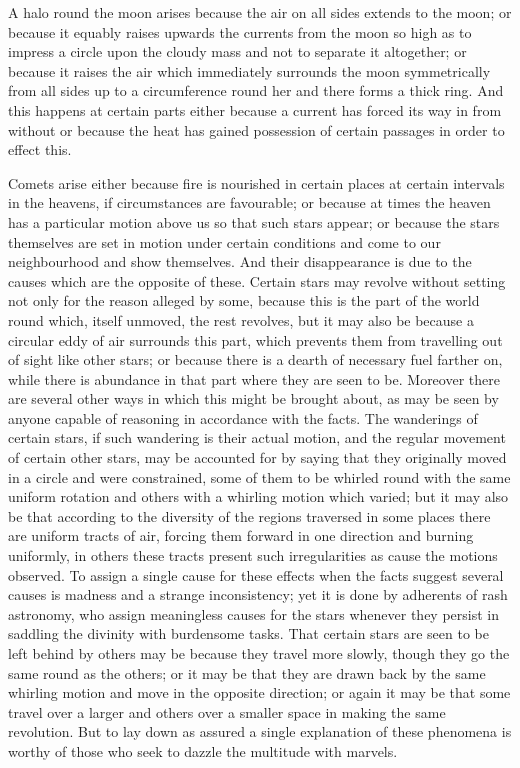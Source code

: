 \documentclass{stex}
\begin{document}
A halo round the moon arises because the air on all sides extends to the moon; or because it equably raises upwards the currents from the moon so high as to impress a circle upon the cloudy mass and not to separate it altogether; or because it raises the air which immediately surrounds the moon symmetrically from all sides up to a circumference round her and there forms a thick ring.
And this happens at certain parts either because a current has forced its way in from without or because the heat has gained possession of certain passages in order to effect this.

Comets arise either because fire is nourished in certain places at certain intervals in the heavens, if circumstances are favourable; or because at times the heaven has a particular motion above us so that such stars appear; or because the stars themselves are set in motion under certain conditions and come to our neighbourhood and show themselves.
And their disappearance is due to the causes which are the opposite of these.
Certain stars may revolve without setting not only for the reason alleged by some, because this is the part of the world round which, itself unmoved, the rest revolves, but it may also be because a circular eddy of air surrounds this part, which prevents them from travelling out of sight like other stars; or because there is a dearth of necessary fuel farther on, while there is abundance in that part where they are seen to be.
Moreover there are several other ways in which this might be brought about, as may be seen by anyone capable of reasoning in accordance with the facts.
The wanderings of certain stars, if such wandering is their actual motion, and the regular movement of certain other stars, may be accounted for by saying that they originally moved in a circle and were constrained, some of them to be whirled round with the same uniform rotation and others with a whirling motion which varied; but it may also be that according to the diversity of the regions traversed in some places there are uniform tracts of air, forcing them forward in one direction and burning uniformly, in others these tracts present such irregularities as cause the motions observed.
To assign a single cause for these effects when the facts suggest several causes is madness and a strange inconsistency; yet it is done by adherents of rash astronomy, who assign meaningless causes for the stars whenever they persist in saddling the divinity with burdensome tasks.
That certain stars are seen to be left behind by others may be because they travel more slowly, though they go the same round as the others; or it may be that they are drawn back by the same whirling motion and move in the opposite direction; or again it may be that some travel over a larger and others over a smaller space in making the same revolution.
But to lay down as assured a single explanation of these phenomena is worthy of those who seek to dazzle the multitude with marvels.
\end{document}
